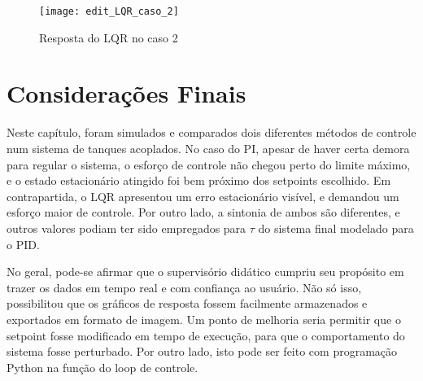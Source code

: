 \begin{figure}[htb]
	\centering
	\caption{Resposta do LQR no caso 2}
	\texttt{[image: edit\_LQR\_caso\_2]}
	\label{img_edit_lqr_caso_2}
\end{figure}

\section{Considerações Finais}

Neste capítulo, foram simulados e comparados dois diferentes métodos de controle num sistema de tanques acoplados. No caso do PI, apesar de haver certa demora para regular o sistema, o esforço de controle não chegou perto do limite máximo, e o estado estacionário atingido foi bem próximo dos setpoints escolhido. Em contrapartida, o LQR apresentou um erro estacionário visível, e demandou um esforço maior de controle. Por outro lado, a sintonia de ambos são diferentes, e outros valores podiam ter sido empregados para $\tau$ do sistema final modelado para o PID.

No geral, pode-se afirmar que o supervisório didático cumpriu seu propósito em trazer os dados em tempo real e com confiança ao usuário. Não só isso, possibilitou que os gráficos de resposta fossem facilmente armazenados e exportados em formato de imagem. Um ponto de melhoria seria permitir que o setpoint fosse modificado em tempo de execução, para que o comportamento do sistema fosse perturbado. Por outro lado, isto pode ser feito com programação Python na função do loop de controle.